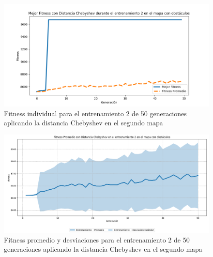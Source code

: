\documentclass[lettersize, journal]{IEEEtran}
\begin{document}
\begin{figure}[H]
    \centering
    \includegraphics[width=0.9 \linewidth]{Chebyshev/Mapa2/Fitness_2_Map2_Cheby_50Gen.png}
    \caption{Fitness individual para el entrenamiento 2 de 50 generaciones aplicando la distancia Chebyshev en el segundo mapa}
    \label{fig:cheb_2_50_m2}
\end{figure}
\begin{figure}[H]
    \centering
    \includegraphics[width=0.9 \linewidth]{Chebyshev/Mapa2/Fitness_2_Map2_Cheby_50Gen_Sombra.png}
    \caption{Fitness promedio y desviaciones para el entrenamiento 2 de 50 generaciones aplicando la distancia Chebyshev en el segundo mapa}
    \label{fig:cheb_2_50_sombra_m2}
\end{figure}
\end{document}
